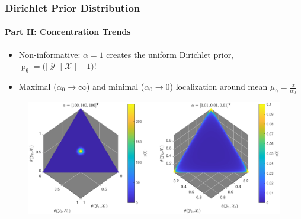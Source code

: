 \documentclass[aspectratio=169,usenames,dvipsnames]{beamer}
\DeclareMathOperator{\prm}{\mathrm{p}}
\DeclareMathOperator{\Xcal}{\mathcal{X}}
\DeclareMathOperator{\Ycal}{\mathcal{Y}}
\begin{document}
\begin{frame}
\frametitle{Dirichlet Prior Distribution}
\framesubtitle{Part II: Concentration Trends}

\begin{itemize}
\item Non-informative: $\alpha = 1$ creates the uniform Dirichlet prior, $\prm_{\uptheta} = \big( |\Ycal||\Xcal|-1 \big)!$
\vspace{0.5em}
\item Maximal ($\alpha_0 \to \infty$) and minimal ($\alpha_0 \to 0$) localization around mean $\mu_{\uptheta} = \frac{\alpha}{\alpha_0}$
\end{itemize}

\begin{figure}
\centering
\includegraphics[width=0.8\linewidth]{P_theta_hrz.pdf}
\end{figure}


\end{frame}
\end{document}
